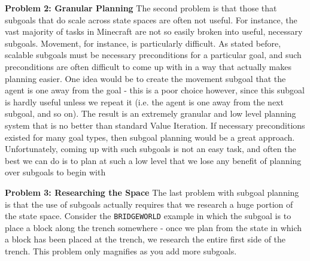 \documentclass[]{article}
\begin{document}
{\bf Problem 2: Granular Planning} The second problem is that those that subgoals 
that do scale across state spaces are often not useful. For instance, the vast majority 
of tasks in Minecraft are not so easily broken into useful, necessary subgoals. 
Movement, for instance, is particularly difficult. As stated before, scalable subgoals 
must be necessary preconditions for a particular goal, and such preconditions are 
often difficult to come up with in a way that actually makes planning easier. One 
idea would be to create the movement subgoal that the agent is one away from 
the goal - this is a poor choice however, since this subgoal is hardly useful unless 
we repeat it (i.e. the agent is one away from the next subgoal, and so on). The 
result is an extremely granular and low level planning system that is no better 
than standard Value Iteration. If necessary preconditions existed for many goal 
types, then subgoal planning would be a great approach. Unfortunately, coming 
up with such subgoals is not an easy task, and often the best we can do is to 
plan at such a low level that we lose any benefit of planning over subgoals to begin with


{\bf Problem 3: Researching the Space} The last problem with subgoal planning 
is that the use of subgoals actually requires that we research a huge portion of 
the state space. Consider the \texttt{BRIDGEWORLD} example in which the 
subgoal is to place a block along the trench somewhere - once we plan from the 
state in which a block has been placed at the trench, we research the entire first 
side of the trench. This problem only magnifies as you add more subgoals.
\end{document}
